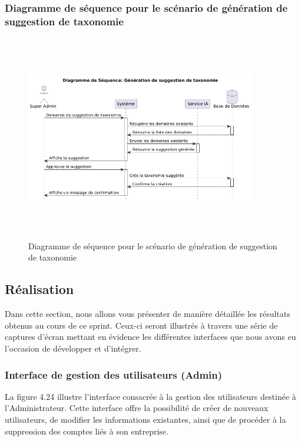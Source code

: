 \subsubsection{Diagramme de séquence pour le scénario de génération de suggestion de taxonomie}
\begin{figure}[H]
    \centering
    \includegraphics[width=10cm,height=9cm]{images/taxonomyaisq.png}
    \caption{Diagramme de séquence pour le scénario de génération de suggestion de taxonomie}
\end{figure}

\subsection{Réalisation}
\noindent Dans cette section, nous allons vous présenter de manière détaillée les résultats obtenus au cours de ce sprint. Ceux-ci seront illustrés à travers une série de captures d’écran mettant en évidence les différentes interfaces que nous avons eu l’occasion de développer et d’intégrer.

\subsubsection{Interface de gestion des utilisateurs (Admin)}
\noindent La figure 4.24 illustre l’interface consacrée à la gestion des utilisateurs destinée à l’Administrateur. Cette interface offre la possibilité de créer de nouveaux utilisateurs, de modifier les informations existantes, ainsi que de procéder à la suppression des comptes liés à son entreprise.

